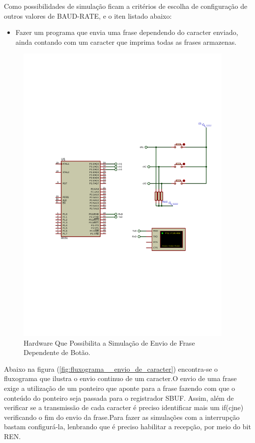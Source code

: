 \documentclass{Fabiano_file}
\begin{document}
{Como possibilidades de simulação ficam a critérios de escolha de configuração de outros valores de BAUD-RATE, e o iten listado abaixo:

\begin{itemize}
\item Fazer um programa que envia uma frase dependendo do caracter enviado, ainda contando com um caracter que imprima todas as frases armazenas.
\end{itemize}

\newpage

\begin{figure}[h!]
\centering
\includegraphics[width=0.95\textwidth]{botoes_serial.pdf}
\caption{Hardware Que Possibilita a Simulação de Envio de Frase Dependente de Botão.}
\label{fig:botoes_serial}
\end{figure}

\newpage

Abaixo na figura (\ref{fig:fluxograma__envio_de_caracter}) encontra-se o fluxograma que ilustra o envio continuo de um caracter.O envio de uma frase exige 
a utilização de um ponteiro que aponte para a frase fazendo com que o conteúdo do ponteiro seja passada para o registrador SBUF.
Assim, além de verificar se a transmissão de cada caracter é preciso identificar mais um if(cjne) verificando o fim do envio da frase.Para fazer as 
simulações com a interrupção bastam configurá-la, lenbrando que é preciso habilitar a recepção, por meio do bit REN.\\


}
\end{document}
